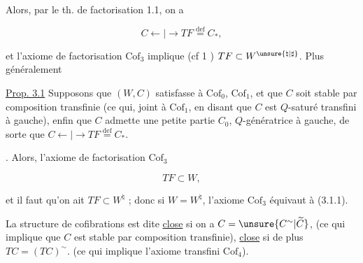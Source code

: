 
Alors, par le th. de factorisation 1.1, on a

\[
 C\mathrel{\leftarrow\!\!|\!\!\rightarrow}TF\overset{\mathrm{def}}{=}C_*,
\]

et l'axiome de factorisation $\mathrm{Cof}_3$ implique
(cf 1 ) $TF\subset W^{\unsure{\natural|\sharp}}$. Plus généralement

\uline{Prop. 3.1} Supposons  que  $(W,C)$ satisfasse
à $\mathrm{Cof}_0$, $\mathrm{Cof}_1$, et que $C$ soit stable par
composition transfinie (ce qui, joint à $\mathrm{Cof}_1$,
 en disant que $C$ est $Q$-saturé
transfini à gauche), enfin que $C$
admette une petite partie $C_0$, $Q$-génératrice
à gauche, de sorte que $C\mathrel{\leftarrow\!\!|\!\!\rightarrow}TF\overset{\mathrm{def}}{=}C_*$.

. Alors,  l'axiome de
factorisation $\mathrm{Cof}_3$ 

\[
 TF\subset W,\tag*{(3.1.1)}
\]

et il faut qu'on ait $TF\subset W^{\natural}$ ; donc si $W=W^{\natural}$,
l'axiome $\mathrm{Cof}_3$ équivaut à (3.1.1).

La structure de cofibrations est dite \uline{close}
si  on a $C=\unsure{C^{\sim}|\widetilde C}$, (ce qui implique
que $C$ est stable par composition transfinie),
\uline{close} si de plus $TC=(TC)^{\sim}$. (ce qui
implique l'axiome transfini $\mathrm{Cof}_4$).
